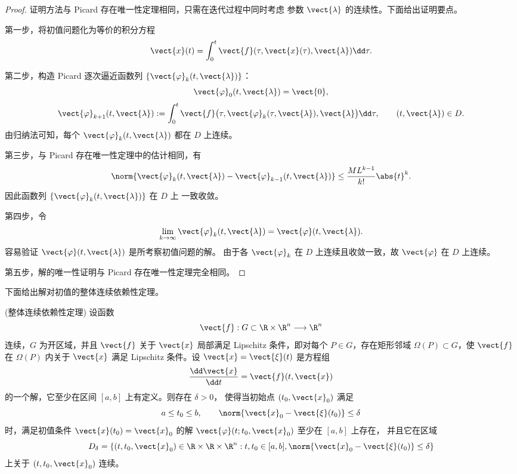\begin{proof}
	证明方法与 Picard 存在唯一性定理相同，只需在迭代过程中同时考虑
	参数 $\vect{\lambda}$ 的连续性。下面给出证明要点。

	第一步，将初值问题化为等价的积分方程
	\[
		\vect{x}(t)
		=\int_0^t
		\vect{f}(\tau,\vect{x}(\tau),\vect{\lambda})\dd\tau.
	\]

	第二步，构造 Picard 逐次逼近函数列
	$\{\vect{\varphi}_k(t,\vect{\lambda})\}$：
	\[
		\vect{\varphi}_0(t,\vect{\lambda})=\vect{0},
	\]
	\[
		\vect{\varphi}_{k+1}(t,\vect{\lambda})\mathrel{:=}
		\int_0^t
		\vect{f}\bigl(
		\tau,\vect{\varphi}_k(\tau,\vect{\lambda}),\vect{\lambda}
		\bigr)\dd\tau,
		\qquad (t,\vect{\lambda})\in D.
	\]
	由归纳法可知，每个 $\vect{\varphi}_k(t,\vect{\lambda})$ 都在
	$D$ 上连续。

	第三步，与 Picard 存在唯一性定理中的估计相同，有
	\[
		\norm{
		\vect{\varphi}_k(t,\vect{\lambda})
		-\vect{\varphi}_{k-1}(t,\vect{\lambda})
		}
		\leq
		\dfrac{ML^{k-1}}{k!}\abs{t}^k.
	\]
	因此函数列 $\{\vect{\varphi}_k(t,\vect{\lambda})\}$ 在 $D$ 上
	一致收敛。

	第四步，令
	\[
		\lim_{k\to\infty}\vect{\varphi}_k(t,\vect{\lambda})
		=\vect{\varphi}(t,\vect{\lambda}).
	\]
	容易验证 $\vect{\varphi}(t,\vect{\lambda})$ 是所考察初值问题的解。
	由于各 $\vect{\varphi}_k$ 在 $D$ 上连续且收敛一致，故
	$\vect{\varphi}$ 在 $D$ 上连续。

	第五步，解的唯一性证明与 Picard 存在唯一性定理完全相同。
\end{proof}

下面给出解对初值的整体连续依赖性定理。

\begin{theorem}(整体连续依赖性定理)\label{thm:整体连续依赖性定理}
	设函数
	\[
		\vect{f}:G\subset\R\times\R^n\longrightarrow\R^n
	\]
	连续，$G$ 为开区域，并且 $\vect{f}$ 关于 $\vect{x}$ 局部满足
	Lipschitz 条件，即对每个 $P\in G$，存在矩形邻域
	$\Omega(P)\subset G$，使 $\vect{f}$ 在 $\Omega(P)$ 内关于
	$\vect{x}$ 满足 Lipschitz 条件。设
	$\vect{x}=\vect{\xi}(t)$ 是方程组
	\[
		\dfrac{\dd\vect{x}}{\dd t}=\vect{f}(t,\vect{x})
	\]
	的一个解，它至少在区间 $[a,b]$ 上有定义。则存在 $\delta>0$，
	使得当初始点 $(t_0,\vect{x}_0)$ 满足
	\[
		a\leq t_0\leq b,
		\qquad
		\norm{\vect{x}_0-\vect{\xi}(t_0)}\leq\delta
	\]
	时，满足初值条件 $\vect{x}(t_0)=\vect{x}_0$ 的解
	$\vect{\varphi}(t;t_0,\vect{x}_0)$ 至少在 $[a,b]$ 上存在，
	并且它在区域
	\[
		D_\delta=\left\{
		(t,t_0,\vect{x}_0)\in\R\times\R\times\R^n:
		t,t_0\in[a,b],
		\norm{\vect{x}_0-\vect{\xi}(t_0)}\leq\delta
		\right\}
	\]
	上关于 $(t,t_0,\vect{x}_0)$ 连续。
\end{theorem}

